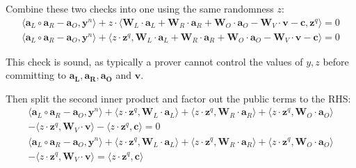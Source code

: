 \documentclass[../../book.tex]{subfiles}
\begin{document}
Combine these two checks into one using the same randomness $z$:
\begin{equation*}
    \begin{aligned}
        \langle \mathbf{a}_L \circ \mathbf{a}_R - \mathbf{a}_O, \mathbf{y}^n \rangle + z \cdot \langle \mathbf{W}_L \cdot \mathbf{a}_L + \mathbf{W}_R \cdot \mathbf{a}_R + \mathbf{W}_O \cdot \mathbf{a}_O - \mathbf{W}_V \cdot \mathbf{v} - \mathbf{c}, \mathbf{z}^q \rangle = 0 \\
        \langle \mathbf{a}_L \circ \mathbf{a}_R - \mathbf{a}_O, \mathbf{y}^n \rangle + \langle z \cdot \mathbf{z}^q,  \mathbf{W}_L \cdot \mathbf{a}_L + \mathbf{W}_R \cdot \mathbf{a}_R + \mathbf{W}_O \cdot \mathbf{a}_O - \mathbf{W}_V \cdot \mathbf{v} - \mathbf{c} \rangle = 0
    \end{aligned}
\end{equation*}

This check is sound, as typically a prover cannot control the values of $y,z$ before committing to $\mathbf{a_L, a_R, a_O}$ and $\mathbf{v}$.

Then split the second inner product and factor out the public terms to the RHS:
\begin{equation*}
    \begin{aligned}
        \langle \mathbf{a}_L \circ \mathbf{a}_R - \mathbf{a}_O, \mathbf{y}^n \rangle + \langle z \cdot \mathbf{z}^q, \mathbf{W}_L \cdot \mathbf{a}_L \rangle + \langle z \cdot \mathbf{z}^q, \mathbf{W}_R \cdot \mathbf{a}_R \rangle + \langle z \cdot \mathbf{z}^q, \mathbf{W}_O \cdot \mathbf{a}_O \rangle \\ 
        - \langle z \cdot \mathbf{z}^q, \mathbf{W}_V \cdot \mathbf{v} \rangle - \langle z \cdot \mathbf{z}^q, \mathbf{c} \rangle = 0 \\
        \langle \mathbf{a}_L \circ \mathbf{a}_R - \mathbf{a}_O, \mathbf{y}^n \rangle + \langle z \cdot \mathbf{z}^q, \mathbf{W}_L \cdot \mathbf{a}_L \rangle + \langle z \cdot \mathbf{z}^q, \mathbf{W}_R \cdot \mathbf{a}_R \rangle + \langle z \cdot \mathbf{z}^q, \mathbf{W}_O \cdot \mathbf{a}_O \rangle \\ 
        - \langle z \cdot \mathbf{z}^q, \mathbf{W}_V \cdot \mathbf{v} \rangle = \langle z \cdot \mathbf{z}^q, \mathbf{c} \rangle
    \end{aligned}
\end{equation*}
\end{document}
